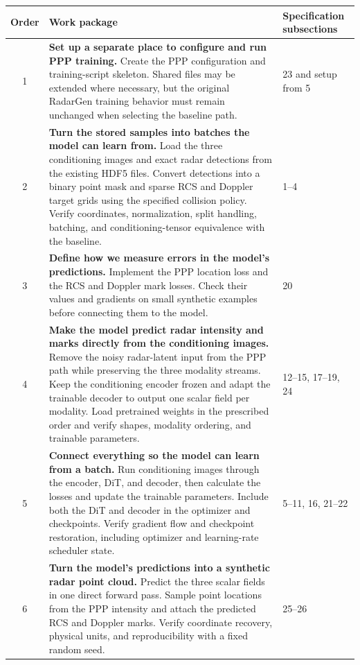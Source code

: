 \documentclass[11pt,a4paper]{article}
\begin{document}
\begin{table}[htbp]
\centering
\small
\renewcommand{\arraystretch}{1.2}
\begin{tabularx}{\textwidth}{@{}c X p{2.7cm}@{}}
\toprule
Order & Work package & Specification subsections \\
\midrule

1 &
\textbf{Set up a separate place to configure and run PPP training.}
Create the PPP configuration and training-script skeleton.
Shared files may be extended where necessary, but the original
RadarGen training behavior must remain unchanged when selecting
the baseline path. &
23 and setup from 5 \\

2 &
\textbf{Turn the stored samples into batches the model can learn from.}
Load the three conditioning images and exact radar detections
from the existing HDF5 files.
Convert detections into a binary point mask and sparse RCS and
Doppler target grids using the specified collision policy.
Verify coordinates, normalization, split handling, batching,
and conditioning-tensor equivalence with the baseline. &
1--4 \\

3 &
\textbf{Define how we measure errors in the model's predictions.}
Implement the PPP location loss and the RCS and Doppler mark losses.
Check their values and gradients on small synthetic examples
before connecting them to the model. &
20 \\

4 &
\textbf{Make the model predict radar intensity and marks directly
from the conditioning images.}
Remove the noisy radar-latent input from the PPP path while
preserving the three modality streams.
Keep the conditioning encoder frozen and adapt the trainable
decoder to output one scalar field per modality.
Load pretrained weights in the prescribed order and verify
shapes, modality ordering, and trainable parameters. &
12--15, 17--19, 24 \\

5 &
\textbf{Connect everything so the model can learn from a batch.}
Run conditioning images through the encoder, DiT, and decoder,
then calculate the losses and update the trainable parameters.
Include both the DiT and decoder in the optimizer and checkpoints.
Verify gradient flow and checkpoint restoration, including
optimizer and learning-rate scheduler state. &
5--11, 16, 21--22 \\

6 &
\textbf{Turn the model's predictions into a synthetic radar
point cloud.}
Predict the three scalar fields in one direct forward pass.
Sample point locations from the PPP intensity and attach the
predicted RCS and Doppler marks.
Verify coordinate recovery, physical units, and reproducibility
with a fixed random seed. &
25--26 \\


\end{tabularx}
\end{table}
\end{document}
